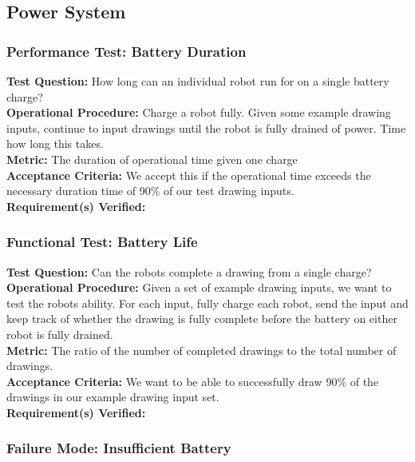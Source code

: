 
\subsection{Power System}
\label{sec:verification_power}

\subsubsection{Performance Test: Battery Duration}
\label{sec:power_pt_battery}
\textbf{Test Question:} How long can an individual robot run for on a single battery charge? \\
\textbf{Operational Procedure:} Charge a robot fully. Given some example drawing inputs, continue to input drawings until the robot is fully drained of power. Time how long this takes. \\
\textbf{Metric:} The duration of operational time given one charge \\
\textbf{Acceptance Criteria:} We accept this if the operational time exceeds the necessary duration time of 90\% of our test drawing inputs. \\
\textbf{Requirement(s) Verified:} 

\subsubsection{Functional Test: Battery Life}
\label{sec:power_ft_battery}
\textbf{Test Question:} Can the robots complete a drawing from a single charge? \\
\textbf{Operational Procedure:} Given a set of example drawing inputs, we want to test the robots ability. For each input, fully charge each robot, send the input and keep track of whether the drawing is fully complete before the battery on either robot is fully drained. \\
\textbf{Metric:} The ratio of the number of completed drawings to the total number of drawings. \\
\textbf{Acceptance Criteria:}  We want to be able to successfully draw 90\% of the drawings in our example drawing input set. \\
\textbf{Requirement(s) Verified:} 

\subsubsection{Failure Mode: Insufficient Battery}
\label{sec:power_fm_battery}
